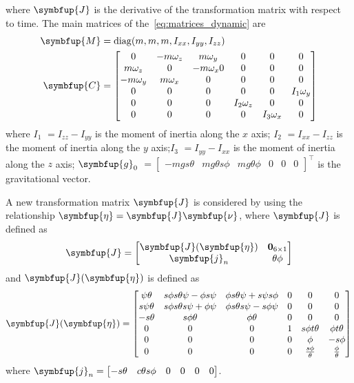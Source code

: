 %
where \(\symbfup{J}\) is the derivative of the transformation matrix with respect to time. 
The main matrices of the~\cref{eq:matrices_dynamic} are
%
\begin{align}
    \symbfup{M} &= \diag(m,m,m,I_{xx},I_{yy},I_{zz})
    \label{eq:diag_M} \\
    \symbfup{C} &= \begin{bmatrix}
        0 & -m\omega_z & m\omega_y & 0 & 0 & 0 \\
        m\omega_z & 0 & -m\omega_x 0 & 0 & 0 & 0\\
        -m\omega_y & m\omega_x & 0 & 0 & 0 & 0 \\
        0 & 0 & 0 & 0 & 0 & I_1\omega_y \\
        0 & 0 & 0 & I_2\omega_z & 0 & 0 \\
        0 & 0 & 0 & 0 & I_3\omega_x& 0 \\
    \end{bmatrix}
    \label{eq:coriolis_matrix}
\end{align}
%
where \(I_1\) \(=I_{zz}-I_{yy}\) is the moment of inertia along the \(x\) axis; \(I_2\) \(=I_{xx}-I_{zz}\) is the moment of inertia along the \(y\) axis;\(I_3\) \(=I_{yy}-I_{xx}\) is the moment of inertia along the \(z\) axis; \(\symbfup{g}_0\) \(= \begin{bmatrix} -mgs\theta & mg\theta s\phi & mg\theta \phi & 0 & 0 & 0\end{bmatrix}^{\intercal}\) is the gravitational vector.


A new transformation matrix \(\symbfup{J}\) is considered by using the relationship \(\symbfup{\eta} = \symbfup{J}\symbfup{\nu}\), where \(\symbfup{J}\) is defined as
%
\begin{equation}
    \symbfup{J} = \begin{bmatrix}
        \symbfup{J}(\symbfup{\eta}) & \mathbf{0}_{6\times 1} \\
        \symbfup{j}_n & \theta\phi
    \end{bmatrix}
    \label{eq:transformation}
\end{equation}
%
and \(\symbfup{J}(\symbfup{\eta})\) is defined as
%
\begin{equation}
    \symbfup{J}(\symbfup{\eta}) = \begin{bmatrix}
        \psi \theta & s\phi s\theta \psi - \phi s\psi & \phi s\theta \psi + s \psi s\phi & 0 & 0 & 0 \\
        s\psi \theta & s\phi s\theta s\psi + \phi \psi & \phi s\theta s \psi - s\phi \psi & 0 & 0 & 0 \\
        -s\theta & s\phi \theta & \phi \theta & 0 & 0 & 0 \\
        0 & 0 & 0 & 1 & s\phi t\theta & \phi t\theta \\
        0 & 0 & 0 & 0 & \phi & -s\phi \\
        0 & 0 & 0 & 0 & \frac{s\phi}{\theta} & \frac{\phi}{\theta}
    \end{bmatrix}
\end{equation}
%
where \(\symbfup{j}_n = \begin{bmatrix}-s\theta & c\theta s\phi & 0 & 0 & 0 & 0 \end{bmatrix}\).